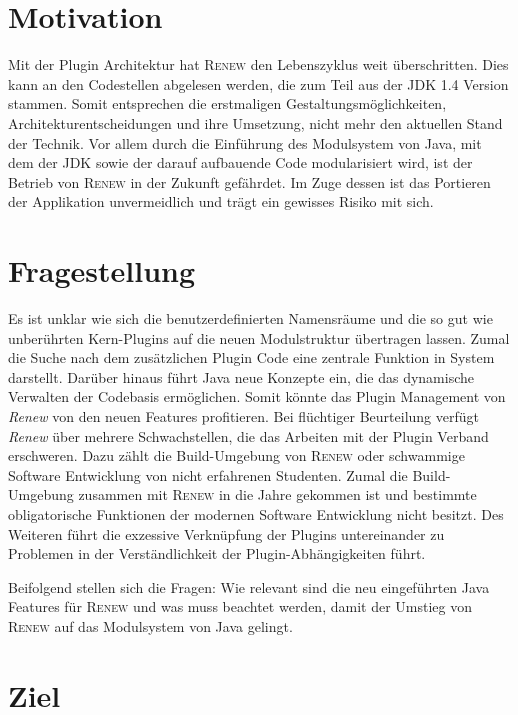 \section{Motivation} \label{sec:motivation}
	Mit der Plugin Architektur hat \textsc{Renew} den Lebenszyklus weit überschritten. Dies kann an den Codestellen abgelesen werden, die zum Teil aus der JDK 1.4 Version stammen. Somit entsprechen die erstmaligen Gestaltungsmöglichkeiten, Architekturentscheidungen und ihre Umsetzung, nicht mehr den aktuellen Stand der Technik. Vor allem durch die Einführung des Modulsystem von Java, mit dem der JDK sowie der darauf aufbauende Code modularisiert wird, ist der Betrieb von \textsc{Renew} in der Zukunft gefährdet. Im Zuge dessen ist das Portieren der Applikation unvermeidlich und trägt ein gewisses Risiko mit sich.

\section{Fragestellung} \label{sec:KdS}
	Es ist unklar wie sich die benutzerdefinierten Namensräume und die so gut wie unberührten Kern-Plugins auf die neuen Modulstruktur übertragen lassen. Zumal die Suche nach dem zusätzlichen Plugin Code eine zentrale Funktion in System darstellt.\newline
	Darüber hinaus führt Java neue Konzepte ein, die das dynamische Verwalten der Codebasis ermöglichen. Somit könnte das Plugin Management von \textit{Renew} von den neuen Features profitieren. \bigbreak
	Bei flüchtiger Beurteilung verfügt \textit{Renew} über mehrere Schwachstellen, die das Arbeiten mit der Plugin Verband erschweren. Dazu zählt die Build-Umgebung von \textsc{Renew} oder schwammige Software Entwicklung von nicht erfahrenen Studenten. Zumal die Build-Umgebung zusammen mit \textsc{Renew} in die Jahre gekommen ist und bestimmte obligatorische Funktionen der modernen Software Entwicklung nicht besitzt. Des Weiteren führt die exzessive Verknüpfung der Plugins untereinander zu Problemen in der Verständlichkeit der Plugin-Abhängigkeiten führt.\bigbreak

	Beifolgend stellen sich die Fragen: Wie relevant sind die neu eingeführten Java Features für \textsc{Renew} und was muss beachtet werden, damit der Umstieg von \textsc{Renew} auf das Modulsystem von Java gelingt.

\section{Ziel} \label{sec:Z}

